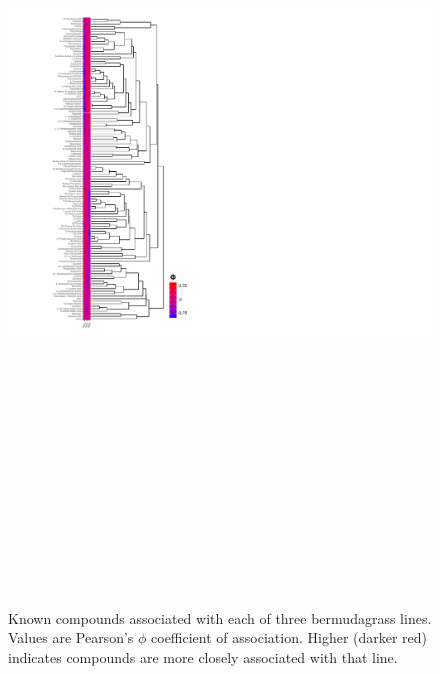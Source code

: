 \documentclass[fleqn,10pt]{wlscirep}
\begin{document}
\begin{figure}
\includegraphics[height = 9in]{figures/publication_figures/figure-3.pdf}
\caption{Known compounds associated with each of three bermudagrass lines.  Values are Pearson's $\phi$ coefficient of association.  Higher (darker red) indicates compounds are more closely associated with that line.  }
\label{fig:figure3}
\end{figure}
\end{document}
